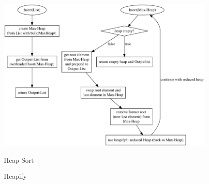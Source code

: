 \begin{figure}[hbt]
    \caption{Heap Sort}
    \centering
    \includegraphics[width = 11cm]{hsort.pdf}\label{fig:hsortentwurf}
\end{figure}

\begin{figure}[hbp]
    \caption{Heapify}
    \centering

\end{figure}

